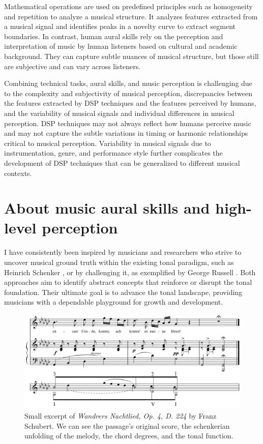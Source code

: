 

Mathematical operations are used on predefined principles such as homogeneity and repetition to analyze a musical structure. It analyzes features extracted from a musical signal and identifies peaks in a novelty curve to extract segment boundaries. In contrast, human aural skills rely on the perception and interpretation of music by human listeners based on cultural and academic background. They can capture subtle nuances of musical structure, but those still are subjective and can vary across listeners.

Combining technical tasks, aural skills, and music perception is challenging due to the complexity and subjectivity of musical perception, discrepancies between the features extracted by DSP techniques and the features perceived by humans, and the variability of musical signals and individual differences in musical perception. DSP techniques may not always reflect how humans perceive music and may not capture the subtle variations in timing or harmonic relationships critical to musical perception. Variability in musical signals due to instrumentation, genre, and performance style further complicates the development of DSP techniques that can be generalized to different musical contexts.

\section{About music aural skills and high-level perception}

I have consistently been inspired by musicians and researchers who strive to uncover musical ground truth within the existing tonal paradigm, such as Heinrich Schenker \cite{}, or by challenging it, as exemplified by George Russell \cite{LydianRussell}. Both approaches aim to identify abstract concepts that reinforce or disrupt the tonal foundation. Their ultimate goal is to advance the tonal landscape, providing musicians with a dependable playground for growth and development.


\begin{figure}[ht]
\includegraphics[clip,width=\columnwidth]{figures/schenkerian analysis/SchubertOp4no3.png}%
\caption{Small excerpt of \textit{Wandrers Nachtlied, Op. 4, D. 224} by Franz Schubert. We can see the passage's original score, the schenkerian unfolding of the melody, the chord degrees, and the tonal function.}
\label{fig:Wandrers Nachtlied, Op. 4, D. 224}
\end{figure}

